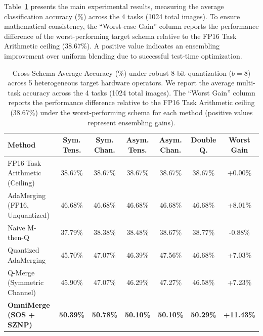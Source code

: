 Table~\ref{tab:main_results} presents the main experimental results, measuring the average classification accuracy (\%) across the 4 tasks (1024 total images). To ensure mathematical consistency, the ``Worst-case Gain'' column reports the performance difference of the worst-performing target schema relative to the FP16 Task Arithmetic ceiling (38.67\%). A positive value indicates an ensembling improvement over uniform blending due to successful test-time optimization.

\begin{table}[t]
\caption{Cross-Schema Average Accuracy (\%) under robust 8-bit quantization ($b=8$) across 5 heterogeneous target hardware operators. We report the average multi-task accuracy across the 4 tasks (1024 total images). The ``Worst Gain'' column reports the performance difference relative to the FP16 Task Arithmetic ceiling (38.67\%) under the worst-performing schema for each method (positive values represent ensembling gains).}
\label{tab:main_results}
\vskip 0.15in
\begin{center}
\begin{small}
\begin{sc}
\setlength{\tabcolsep}{4pt}
\begin{tabular}{lcccccc}
\toprule
Method & Sym. Tens. & Sym. Chan. & Asym. Tens. & Asym. Chan. & Double Q. & Worst Gain \\
\midrule
FP16 Task Arithmetic (Ceiling) & 38.67\% & 38.67\% & 38.67\% & 38.67\% & 38.67\% & +0.00\% \\
AdaMerging (FP16, Unquantized) & 46.68\% & 46.68\% & 46.68\% & 46.68\% & 46.68\% & +8.01\% \\
\midrule
Naive M-then-Q & 37.79\% & 38.38\% & 38.48\% & 38.67\% & 38.77\% & -0.88\% \\
Quantized AdaMerging & 45.70\% & 47.07\% & 46.39\% & 47.56\% & 46.68\% & +7.03\% \\
Q-Merge (Symmetric Channel) & 45.90\% & 47.07\% & 46.29\% & 47.27\% & 46.58\% & +7.23\% \\
\midrule
\textbf{OmniMerge (SOS + SZNP)} & \textbf{50.39\%} & \textbf{50.78\%} & \textbf{50.10\%} & \textbf{50.10\%} & \textbf{50.29\%} & \textbf{+11.43\%} \\
\bottomrule
\end{tabular}
\end{sc}
\end{small}
\end{center}
\vskip -0.1in
\end{table}

